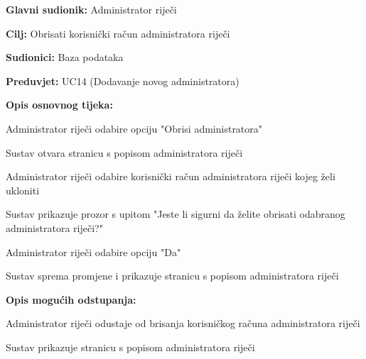 				\noindent {}
				\begin{packed_item}
					
					\item \textbf{Glavni sudionik: }Administrator riječi
					\item  \textbf{Cilj:} Obrisati korisnički račun administratora riječi
					\item  \textbf{Sudionici:} Baza podataka
					\item  \textbf{Preduvjet:} UC14 (Dodavanje novog administratora)
					\item  \textbf{Opis osnovnog tijeka:}
					
					\item[] \begin{packed_enum}
						
						\item Administrator riječi odabire opciju "Obrisi administratora"
						\item Sustav otvara stranicu s popisom administratora riječi
						\item Administrator riječi odabire korisnički račun administratora riječi kojeg želi ukloniti
						\item Sustav prikazuje prozor s upitom "Jeste li sigurni da želite obrisati odabranog administratora riječi?"
						\item Administrator riječi odabire opciju "Da"
						\item Sustav sprema promjene i prikazuje stranicu s popisom administratora riječi
						
					\end{packed_enum}
					
					\item  \textbf{Opis mogućih odstupanja:}
					
					\item[] \begin{packed_item}
						
						\item[4.a] Administrator riječi odustaje od brisanja korisničkog računa administratora riječi
						\item[] \begin{packed_enum}
							
							\item Sustav prikazuje stranicu s popisom administratora riječi
							
						\end{packed_enum}
						
						
					\end{packed_item}
				\end{packed_item}
				

